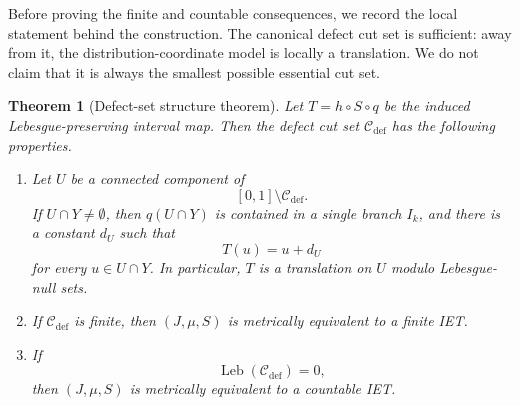 \documentclass[11pt]{amsart}
\theoremstyle{plain}
\newtheorem{theorem}{Theorem}[section]
\theoremstyle{definition}
\theoremstyle{remark}
\DeclareMathOperator{\Leb}{Leb}
\newcommand{\cC}{\mathcal C}
\begin{document}
Before proving the finite and countable consequences, we record the local statement behind
the construction. The canonical defect cut set is sufficient: away from it, the
distribution-coordinate model is locally a translation. We do not claim that it is always the
smallest possible essential cut set.


\begin{theorem}[Defect-set structure theorem]\label{thm:defect-set-structure}\label{thm:finite-defect-support}\label{thm:null-defect-support}
Let \(T=h\circ S\circ q\) be the induced Lebesgue-preserving interval map. Then the defect
cut set \(\cC_{\mathrm{def}}\) has the following properties.
\begin{enumerate}[label=\textup{(\roman*)}]
    \item Let \(U\) be a connected component of
    \[
            [0,1]\setminus \cC_{\mathrm{def}}.
    \]
    If \(U\cap Y\neq\emptyset\), then \(q(U\cap Y)\) is contained in a single branch
    \(I_k\), and there is a constant \(d_U\) such that
    \[
            T(u)=u+d_U
    \]
    for every \(u\in U\cap Y\). In particular, \(T\) is a translation on \(U\) modulo
    Lebesgue-null sets.

    \item If \(\cC_{\mathrm{def}}\) is finite, then \((J,\mu,S)\) is metrically equivalent
    to a finite IET.

    \item If
    \[
            \Leb(\cC_{\mathrm{def}})=0,
    \]
    then \((J,\mu,S)\) is metrically equivalent to a countable IET.
\end{enumerate}
\end{theorem}
\end{document}
